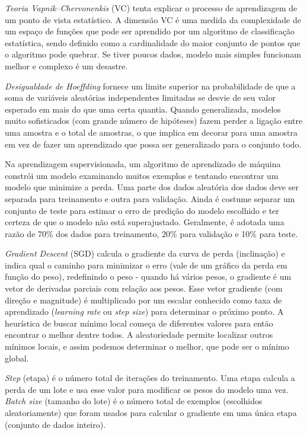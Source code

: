 \textit{Teoria Vapnik–Chervonenkis} (VC) tenta explicar o processo de aprendizagem de um ponto de vista estatístico. A dimensão VC é uma medida da complexidade de um espaço de funções que pode ser aprendido por um algoritmo de classificação estatística, sendo definido como a cardinalidade do maior conjunto de pontos que o algoritmo pode quebrar. Se tiver poucos dados, modelo mais simples funcionam melhor e complexo é um desastre.

\textit{Desigualdade de Hoeffding} fornece um limite superior na probabilidade de que a soma de variáveis aleatórias independentes limitadas se desvie de seu valor esperado em mais do que uma certa quantia. Quando generalizada, modelos muito sofisticados (com grande número de hipóteses) fazem perder a ligação entre uma amostra e o total de amostras, o que implica em decorar para uma amostra em vez de fazer um aprendizado que possa ser generalizado para o conjunto todo.

Na aprendizagem supervisionada, um algoritmo de aprendizado de máquina constrói um modelo examinando muitos exemplos e tentando encontrar um modelo que minimize a perda. Uma parte dos dados aleatória dos dados deve ser separada para treinamento e outra para validação. Ainda é costume separar um conjunto de teste para estimar o erro de predição do modelo escolhido e ter certeza de que o modelo não está superajustado. Geralmente, é adotada uma razão de 70\% dos dados para treinamento, 20\% para validação e 10\% para teste.

\textit{Gradient Descent} (SGD) calcula o gradiente da curva de perda (inclinação) e indica qual o caminho para minimizar o erro (vale de um gráfico da perda em função do peso), redefinindo o peso - quando há vários pesos, o gradiente é um vetor de derivadas parciais com relação aos pesos. Esse vetor gradiente (com direção e magnitude) é multiplicado por um escalar conhecido como taxa de aprendizado (\textit{learning rate} ou \textit{step size}) para determinar o próximo ponto. A heurística de buscar mínimo local começa de diferentes valores para então encontrar o melhor dentre todos. A aleatoriedade permite localizar outros mínimos locais, e assim podemos determinar o melhor, que pode ser o mínimo global.

\textit{Step} (etapa) é o número total de iterações do treinamento. Uma etapa calcula a perda de um lote e usa esse valor para modificar os pesos do modelo uma vez. \textit{Batch size} (tamanho do lote) é o número total de exemplos (escolhidos aleatoriamente) que foram usados para calcular o gradiente em uma única etapa (conjunto de dados inteiro).

